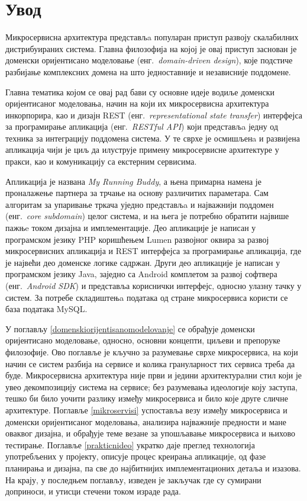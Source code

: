 \documentclass[12pt,oneside]{memoir}
\begin{document}
\frontmatter
\naslovna
\komisija
{}
\apstrakt
\tableofcontents*

\mainmatter

\chapter{Увод}
Микросервисна архитектура представљa популаран приступ развоју скалабилних дистрибуираних система. Главна филозофија на којој је овај приступ заснован је доменски оријентисано моделовање (енг.~\textit{domain-driven design}), које подстиче разбијање комплексних домена на што једноставније и независније поддомене.

Главна тематика којом се овај рад бави су основне идеје водиље доменски оријентисаног моделовања, начин на који их микросервисна архитектура инкорпорира, као и дизајн REST (енг.~\textit{representational state transfer}) интерфејса за програмирање апликација (енг.~\textit{RESTful API}) који представљa једну од техника за интеграцију поддомена система. У те сврхе је осмишљенa и развијена апликација чији је циљ да илуструје примену микросервисне архитектуре у пракси, као и комуникацију са екстерним сервисима.

Апликација је названа \textit{My Running Buddy}, а њена примарна намена је проналажење партнера за трчање на основу различитих параметара. Сам алгоритам за упаривање тркача уједно представљa и најважнији поддомен (енг.~\textit{core subdomain}) целог система, и на њега је потребно обратити највише пажњe током дизајна и имплементације. Део апликације је написан у програмском језику PHP коришћењем Lumen развојног оквира за развој микросервисних апликација и REST интерфејса за програмирање апликација, где је највећи део доменске логике садржан. Други део апликације је написан у програмском језику Java, заједно са Android комплетом за развој софтвера (енг.~\textit{Android SDK}) и представља кориснички интерфејс, односно улазну тачку у систем. За потребе складиштењa података од стране микросервиса користи се база података MySQL.

У поглављу \ref{domenskiorijentisanomodelovanje} се обрађује доменски оријентисано моделовање, односно, основни концепти, циљеви и препоруке филозофије. Ово поглавље је кључно за разумевање сврхе микросервиса, на који начин се систем разбија на сервисе и колика грануларност тих сервиса треба да буде. Микросервисна архитектура није први и једини архитектурални стил који је увео декомпозицију система на сервисе; без разумевања идеологије коју заступа, тешко би било уочити разлику између микросервиса и било које друге сличне архитектуре. Поглавље \ref{mikroservisi} успоставља везу између микросервиса и доменски оријентисаног моделовања, анализира најважније предности и мане оваквог дизајна, и обрађује теме везане за упошљавање микросервиса и њихово тестирање. Поглавље \ref{prakticnideo} укратко даје преглед технологија употребљених у пројекту, описује процес креирања апликације, од фазе планирања и дизајна, па све до најбитнијих имплементационих детаља и изазова. На крају, у последњем поглављу, изведен је закључак где су сумирани доприноси, и утисци стечени током израде рада.
\end{document}
